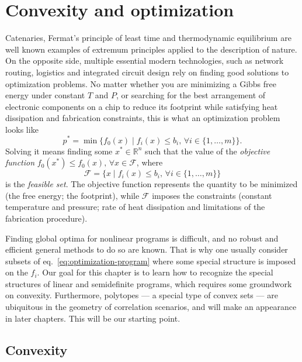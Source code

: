 \chapter{Convexity and optimization}
\label{chap:optimization}
\thispagestyle{empty}  %

	Catenaries, Fermat's principle of least time and thermodynamic equilibrium are well known examples of extremum principles applied to the description of nature. On the opposite side, multiple essential modern technologies, such as network routing, logistics and integrated circuit design rely on finding good solutions to optimization problems. No matter whether you are minimizing a Gibbs free energy under constant $T$ and $P$, or searching for the best arrangement of electronic components on a chip to reduce its footprint while satisfying heat dissipation and fabrication constraints, this is what an optimization problem looks like
	\begin{equation}
		p^* = \min \big\{ f_0(x) \mid f_i(x) \leq b_i, \,\forall i \in \{1, \ldots, m\} \big\} .
		\label{eq:optimization-program}
	\end{equation}
	Solving it means finding some $x^* \in \mathbb{R}^n$ such that the value of the \emph{objective function} $f_0(x^*) \leq f_0(x), \,\forall x \in \mathcal{F}$, where
	$$
	\mathcal{F} = \big\{ x \mid f_i(x) \leq b_i , \,\forall i \in \{1, \ldots, m\} \big\}
	$$
	is the \emph{feasible set}. The objective function represents the quantity to be minimized (the free energy; the footprint), while $\mathcal{F}$ imposes the constraints (constant temperature and pressure; rate of heat dissipation and limitations of the fabrication procedure).
	
	Finding global optima for nonlinear programs is difficult, and no robust and efficient general methods to do so are known. That is why one usually consider subsets of eq.~\ref{eq:optimization-program} where some special structure is imposed on the $f_i$. Our goal for this chapter is to learn how to recognize the special structures of linear and semidefinite programs, which requires some groundwork on convexity. Furthermore, polytopes --- a special type of convex sets --- are ubiquitous in the geometry of correlation scenarios, and will make an appearance in later chapters. This will be our starting point.	


	\section{Convexity}
	\label{sec:convexity}

